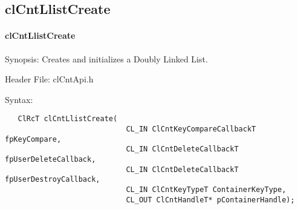 \subsection{clCntLlistCreate}
\hypertarget{pagecnt101}{}\paragraph{cl\-Cnt\-Llist\-Create}\label{pagecnt101}
\begin{Desc}
\item[Synopsis:]Creates and initializes a Doubly Linked List.\end{Desc}
\begin{Desc}
\item[Header File:]clCntApi.h\end{Desc}
\begin{Desc}
\item[Syntax:]

\footnotesize\begin{verbatim}   ClRcT clCntLlistCreate(
                  			CL_IN ClCntKeyCompareCallbackT fpKeyCompare,
                  			CL_IN ClCntDeleteCallbackT fpUserDeleteCallback,
                  			CL_IN ClCntDeleteCallbackT fpUserDestroyCallback,
                  			CL_IN ClCntKeyTypeT ContainerKeyType,
                  			CL_OUT ClCntHandleT* pContainerHandle);
\end{verbatim}
\normalsize
\end{Desc}
